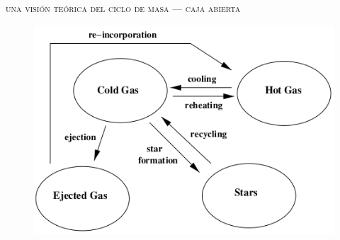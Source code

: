 \documentclass[xcolor=dvipsnames,4pt,hyperref={colorlinks,citecolor=black,linkcolor=black,urlcolor=black}]{beamer}
\begin{document}
\begin{frame}{\textsc{una visión teórica del ciclo de masa --- caja abierta}}

\begin{figure}
\includegraphics[scale=1]{img/delucia2004-1}
\end{figure}




\end{frame}
\end{document}
